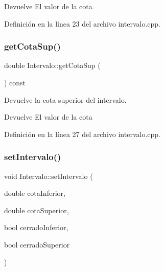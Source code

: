 \begin{DoxyReturn}{Devuelve}
El valor de la cota 
\end{DoxyReturn}


Definición en la línea 23 del archivo intervalo.\+cpp.


\begin{DoxyCode}{0}

\end{DoxyCode}
\mbox{\label{classIntervalo_a2dd767a860e4e85ec3d5a44e78884b76}} 
\subsubsection{\texorpdfstring{getCotaSup()}{getCotaSup()}}
{\footnotesize\ttfamily double Intervalo\+::get\+Cota\+Sup (\begin{DoxyParamCaption}{ }\end{DoxyParamCaption}) const}



Devuelve la cota superior del intervalo. 

\begin{DoxyReturn}{Devuelve}
El valor de la cota 
\end{DoxyReturn}


Definición en la línea 27 del archivo intervalo.\+cpp.


\begin{DoxyCode}{0}

\end{DoxyCode}
\mbox{\label{classIntervalo_a3e7cfa7c148a4e60be7040fecf506313}} 
\subsubsection{\texorpdfstring{setIntervalo()}{setIntervalo()}}
{\footnotesize\ttfamily void Intervalo\+::set\+Intervalo (\begin{DoxyParamCaption}\item[{double}]{cota\+Inferior,  }\item[{double}]{cota\+Superior,  }\item[{bool}]{cerrado\+Inferior,  }\item[{bool}]{cerrado\+Superior }\end{DoxyParamCaption})}



